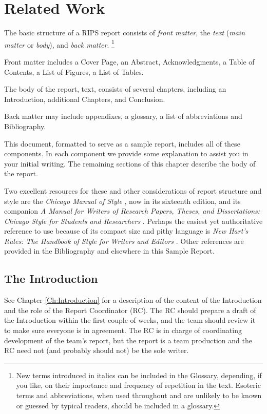\chapter{Related Work}\label{Ch:GeneralOutline}

The basic structure of a RIPS report consists of \emph{front matter}, the \emph{text} (\emph{main matter} or \emph{body}), and \emph{back matter}.%
\footnote{
New terms introduced in italics can be included in the Glossary, depending, if you like, on their importance and frequency of repetition in the text.
Esoteric terms and abbreviations, when used throughout and are unlikely to be known or guessed by typical readers, should be included in a glossary.
}

Front matter includes a Cover Page, an Abstract, Acknowledgments, a Table of
Contents, a List of Figures, a List of Tables.

The body of the report, text, consists of several chapters, including an Introduction, additional Chapters, and Conclusion.

Back matter may include appendixes, a glossary, a list of abbreviations and Bibliography.

This document, formatted to serve as a sample report, includes all of these components. In each component we provide some explanation to assist you in your initial writing. 
The remaining sections of this chapter describe the body of the report.

Two excellent resources for these and other considerations of report structure and style are the \emph{Chicago Manual of Style} \cite{Chicago-Manual}, now in its sixteenth edition, and its companion \emph{A Manual for Writers of Research Papers, Theses, and Dissertations: Chicago Style for Students and Researchers} \cite{Turabian}.
Perhaps the easiest yet authoritative reference to use because of its compact size and pithy language is \emph{New Hart's Rules: The Handbook of Style for Writers and Editors} \cite{NewHartRules}.
Other references are provided in the Bibliography and elsewhere in this Sample Report.

\section{The Introduction}

See Chapter \ref{Ch:Introduction} for a description of the content of the Introduction and the role of the Report Coordinator (RC).
The RC should prepare a draft of the Introduction within the first couple of weeks, and the team should review it to make sure everyone is in agreement.
The RC is in charge of coordinating development of the team's report, but the report is a team production and the RC need not (and probably should not) be the sole writer.

